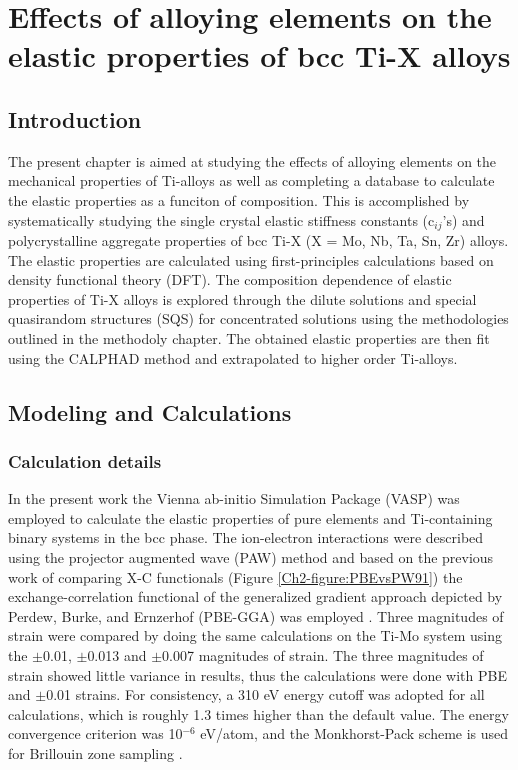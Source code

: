 \chapter{Effects of alloying elements on the elastic properties of bcc Ti-X alloys}

\section{Introduction}

The present chapter is aimed at studying the effects of alloying elements on the mechanical properties of Ti-alloys as well as completing a database to calculate the elastic properties as a funciton of composition. This is accomplished by systematically studying the single crystal elastic stiffness constants (c$_{ij}$'s) and polycrystalline aggregate properties of bcc Ti-X (X = Mo, Nb, Ta, Sn, Zr) alloys. The elastic properties are calculated using first-principles calculations based on density functional theory (DFT). The composition dependence of elastic properties of Ti-X alloys is explored through the dilute solutions and special quasirandom structures (SQS) \cite{Jiang2004} for concentrated solutions using the methodologies outlined in the methodoly chapter. The obtained elastic properties are then fit using the CALPHAD method and extrapolated to higher order Ti-alloys. 

\section{Modeling and Calculations}

\subsection{Calculation details}
In the present work the Vienna ab-initio Simulation Package (VASP) \cite{Kresse1996} was employed to calculate the elastic properties of pure elements and Ti-containing binary systems in the bcc phase. The ion-electron interactions were described using the projector augmented wave (PAW) \cite{Kresse1999,Blochl1994} method and based on the previous work of comparing X-C functionals (Figure \ref{Ch2-figure:PBEvsPW91}) the exchange-correlation functional of the generalized gradient approach depicted by Perdew, Burke, and Ernzerhof (PBE-GGA) was employed \cite{Perdew1996a}. Three magnitudes of strain were compared by doing the same calculations on the Ti-Mo system using the  $\pm$0.01, $\pm$0.013 and $\pm$0.007 magnitudes of strain. The three magnitudes of strain showed little variance in results, thus the calculations were done with PBE and $\pm$0.01 strains. For consistency, a 310 eV energy cutoff was adopted for all calculations, which is roughly 1.3 times higher than the default value. The energy convergence criterion was 10$^{-6}$ eV/atom, and the Monkhorst-Pack scheme is used for Brillouin zone sampling \cite{Kresse1996,Monkhorst1976a}. 

